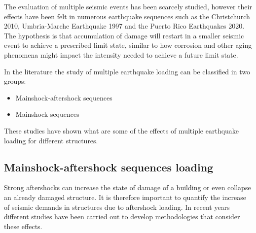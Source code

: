The evaluation of multiple seismic events has been scarcely studied, however their effects have been felt in numerous earthquake sequences such as the Christchurch 2010, Umbria-Marche Earthquake 1997 and the Puerto Rico Earthquakes 2020. The hypothesis is that accumulation of damage will restart in a smaller seismic event to achieve a prescribed limit state, similar to how corrosion and other aging phenomena might impact the intensity needed to achieve a future limit state. 

In the literature the study of multiple earthquake loading can be classified in two groups:

\begin{itemize}
	\item Mainshock-aftershock sequences
	\item Mainshock sequences
\end{itemize}

These studies have shown what are some of the effects of multiple earthquake loading for different structures.

\subsection{Mainshock-aftershock sequences loading }

Strong aftershocks can increase the state of damage of a building or even collapse an already damaged structure. It is therefore important to quantify the increase of seismic demands in structures due to aftershock loading. In recent years different studies have been carried out to develop methodologies that consider these effects.

